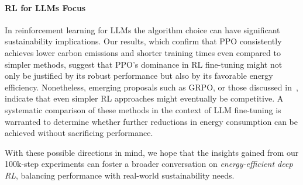 \paragraph{RL for LLMs Focus}
In reinforcement learning for LLMs the algorithm choice can have significant sustainability implications. Our results, which confirm that PPO consistently achieves lower carbon emissions and shorter training times even compared to simpler methods, suggest that PPO's dominance in RL fine-tuning might not only be justified by its robust performance but also by its favorable energy efficiency. Nonetheless, emerging proposals such as GRPO, or those discussed in~\cite{ahmadian:back_to_basics}, indicate that even simpler RL approaches might eventually be competitive. A systematic comparison of these methods in the context of LLM fine-tuning is warranted to determine whether further reductions in energy consumption can be achieved without sacrificing performance.

With these possible directions in mind, we hope that the insights gained from 
our 100k-step experiments can foster a broader conversation on 
\emph{energy-efficient deep RL}, balancing performance with real-world sustainability needs.
